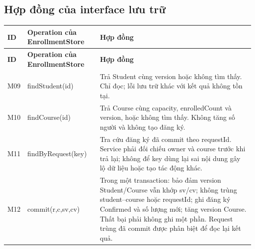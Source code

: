 \subsection{Hợp đồng của interface lưu trữ}
\begin{longtable}{|L{15mm}|L{43mm}|L{82mm}|}\hline
\textbf{ID} & \textbf{Operation của EnrollmentStore} & \textbf{Hợp đồng}\\\hline
\endfirsthead
\hline
\textbf{ID} & \textbf{Operation của EnrollmentStore} & \textbf{Hợp đồng}\\\hline
\endhead
M09 & findStudent(id) & Trả Student cùng version hoặc không tìm thấy. Chỉ đọc; lỗi lưu trữ khác với kết quả không tồn tại.\\\hline
M10 & findCourse(id) & Trả Course cùng capacity, enrolledCount và version, hoặc không tìm thấy. Không tăng số người và không tạo đăng ký.\\\hline
M11 & findByRequest(key) & Tra cứu đăng ký đã commit theo requestId. Service phải đối chiếu owner và course trước khi trả lại; không để key dùng lại sai nội dung gây lộ dữ liệu hoặc tạo tác động khác.\\\hline
M12 & commit(r,c,sv,cv) & Trong một transaction: bảo đảm version Student/Course vẫn khớp sv/cv; không trùng student--course hoặc requestId; ghi đăng ký Confirmed và số lượng mới; tăng version Course. Thất bại phải không ghi một phần. Request trùng đã commit được phân biệt để đọc lại kết quả.\\\hline
\end{longtable}

